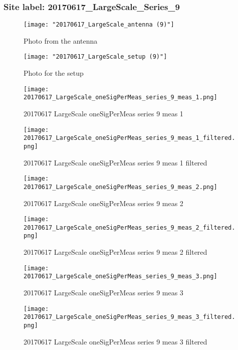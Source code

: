 \subsubsection{Site label: 20170617\_LargeScale\_Series\_9}
\begin{figure}[ht] \caption{Photo from the antenna}
\texttt{[image: "20170617\_LargeScale\_antenna (9)"]}\centering\end{figure}
\begin{figure}[ht] \caption{Photo for the setup}
\texttt{[image: "20170617\_LargeScale\_setup (9)"]}\centering\end{figure}
\begin{figure}[ht] \caption{20170617 LargeScale oneSigPerMeas series 9 meas 1}
\texttt{[image: 20170617\_LargeScale\_oneSigPerMeas\_series\_9\_meas\_1.png]}\centering\end{figure}
\begin{figure}[ht] \caption{20170617 LargeScale oneSigPerMeas series 9 meas 1 filtered}
\texttt{[image: 20170617\_LargeScale\_oneSigPerMeas\_series\_9\_meas\_1\_filtered.png]}\centering\end{figure}
\begin{figure}[ht] \caption{20170617 LargeScale oneSigPerMeas series 9 meas 2}
\texttt{[image: 20170617\_LargeScale\_oneSigPerMeas\_series\_9\_meas\_2.png]}\centering\end{figure}
\begin{figure}[ht] \caption{20170617 LargeScale oneSigPerMeas series 9 meas 2 filtered}
\texttt{[image: 20170617\_LargeScale\_oneSigPerMeas\_series\_9\_meas\_2\_filtered.png]}\centering\end{figure}
\begin{figure}[ht] \caption{20170617 LargeScale oneSigPerMeas series 9 meas 3}
\texttt{[image: 20170617\_LargeScale\_oneSigPerMeas\_series\_9\_meas\_3.png]}\centering\end{figure}
\begin{figure}[ht] \caption{20170617 LargeScale oneSigPerMeas series 9 meas 3 filtered}
\texttt{[image: 20170617\_LargeScale\_oneSigPerMeas\_series\_9\_meas\_3\_filtered.png]}\centering\end{figure}
\clearpage
